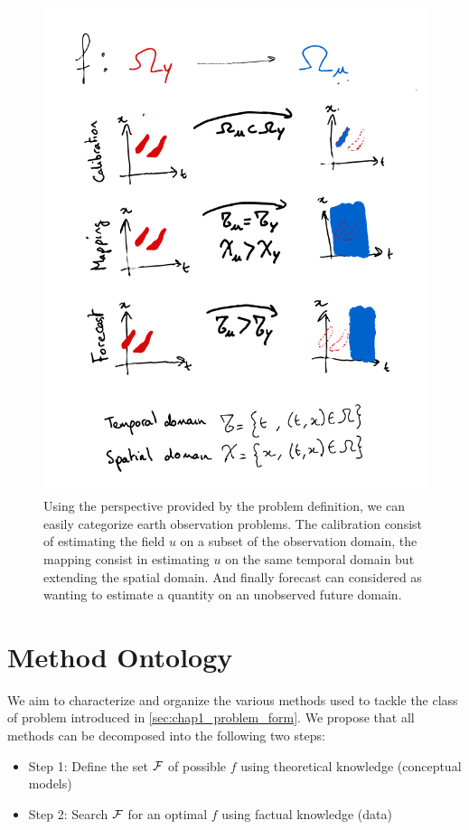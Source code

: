 \begin{bibunit}
\begin{figure}[htbp]
\begin{center}
\includegraphics[width=0.8\linewidth]{Chapitre1/Ch1-Figures/Task_ontology.png}
\end{center}
\caption[Task characterization through the domains $\Omega_u$ and $\Omega_y$ of $u$ and $y$]
{\footnotesize Using the perspective provided by the problem definition, we can easily categorize earth observation problems.
The calibration consist of estimating the field $u$ on a subset of the observation domain, the mapping consist in estimating $u$ on the same temporal domain but extending the spatial domain.
And finally forecast can considered as wanting to estimate a quantity on an unobserved future domain.}
\label{fig:task_ontology}
\end{figure}

\section{Method Ontology}
We aim to characterize and organize the various methods used to tackle the class of problem introduced in \ref{sec:chap1_problem_form}. We propose that all methods can be decomposed into the following two steps:
\begin{itemize}
\item Step 1: Define the set $\cal{F}$ of possible $f$ using theoretical knowledge (conceptual models)
\item Step 2: Search $\cal{F}$ for an optimal $f$ using factual knowledge (data)
\end{itemize}


\end{bibunit}
